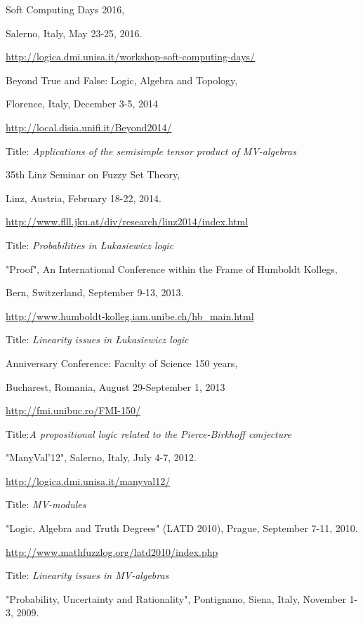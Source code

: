 \documentclass[11pt]{article}
\begin{document}
\noindent [T8]  Soft Computing Days 2016, 

Salerno, Italy, May 23-25, 2016.

\url{http://logica.dmi.unisa.it/workshop-soft-computing-days/}

\noindent [T7] Beyond True and False: Logic, Algebra and Topology,

Florence, Italy, December 3-5, 2014 


\url{http://local.disia.unifi.it/Beyond2014/}


Title: {\em Applications of the semisimple tensor product of MV-algebras}


\noindent [T6] 35th Linz Seminar on Fuzzy Set Theory,

Linz, Austria, February 18-22, 2014.

\url{http://www.flll.jku.at/div/research/linz2014/index.html}


Title: {\em Probabilities  in \L ukasiewicz logic}


\noindent [T5] "Proof", An International Conference within the Frame of Humboldt Kollegs,

Bern, Switzerland, September 9-13, 2013.

\url{http://www.humboldt-kolleg.iam.unibe.ch/hb_main.html}


Title: {\em Linearity issues in \L ukasiewicz logic}


\noindent[T4] Anniversary Conference: Faculty of Science 150 years,

Bucharest, Romania, August 29-September 1, 2013 

\url{http://fmi.unibuc.ro/FMI-150/}

Title:{\em A propositional logic related to the Pierce-Birkhoff conjecture}


\noindent [T3 ]  "ManyVal’12",
Salerno, Italy, July 4-7, 2012.

\url{http://logica.dmi.unisa.it/manyval12/}


Title: {\em MV-modules}

\vspace{.1cm}\noindent [T2]  "Logic,
Algebra and Truth Degrees" (LATD 2010), Prague, September 7-11,
2010.

 \url{http://www.mathfuzzlog.org/latd2010/index.php}


Title: {\em Linearity issues in MV-algebras}

\vspace{.1cm}\noindent [T1] "Probability,
Uncertainty and Rationality", Pontignano, Siena, Italy, November
1-3, 2009.
\end{document}
